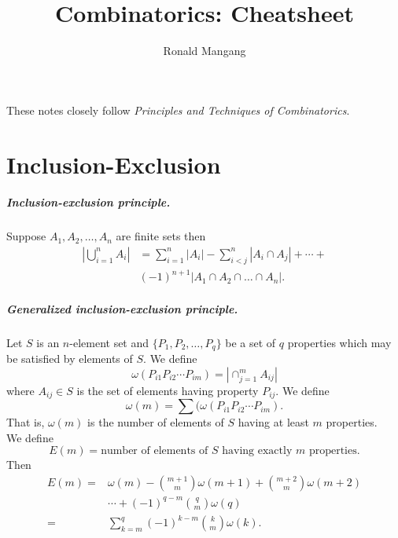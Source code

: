 \documentclass[12pt,english,oneside]{scrbook}
\numberwithin{equation}{chapter}
\theoremstyle{definition}
\theoremstyle{plain}
\begin{document}
\title{Combinatorics: Cheatsheet}
\author{Ronald Mangang}

\maketitle
\tableofcontents
\vfill
These notes closely follow \textit{Principles and Techniques of Combinatorics}.
\thispagestyle{empty}
\newpage
{}


\chapter{Inclusion-Exclusion}

\paragraph{Inclusion-exclusion principle.}




Suppose $A_1, A_2, \ldots, A_n$ are finite sets then
\begin{align*}
  |\bigcup_{i=1}^n A_i | &= \sum_{i=1}^n|A_i|-\sum_{i<j}^n |A_i \cap A_j | +
  \cdots + \\
  &(-1)^{n+1} |A_1 \cap A_2 \cap \ldots \cap A_n |.
\end{align*}

\paragraph*{Generalized inclusion-exclusion principle.}
Let $S$ is an $n$-element set and $\{P_1,P_2, \ldots,P_q\}$ be a set of $q$ properties which may be satisfied by elements of $S$. We define
\[
  \omega(P_{i1}P_{i2}\cdots P_{im}) = |\cap_{j=1}^m A_{ij} |
\]
where $A_{ij} \in S$ is the set of elements having property $P_{ij}$. We define
\[
  \omega(m) = \sum(\omega(P_{i1}P_{i2}\cdots P_{im}).
\]
That is, $\omega(m)$ is the number of elements of $S$ having at least $m$ properties.\\

We define
\[
  E(m) = \text{number of elements of $S$ having exactly $m$ properties.}
\]
Then
\begin{align*}
  E(m) =& \omega(m) - \binom{m+1}{m}\omega(m+1)+\binom{m+2}{m}\omega(m+2) \\
        & \cdots + (-1)^{q-m}\binom{q}{m}\omega(q) \\
  =& \sum_{k=m}^q (-1)^{k-m}\binom{k}{m}\omega (k).
\end{align*}
\end{document}
